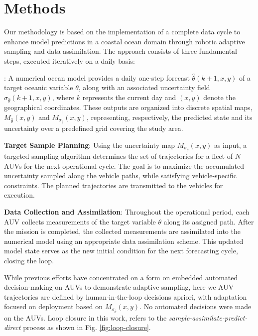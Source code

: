 \section{Methods}
\label{sec:methods}


Our methodology is based on the implementation of a complete data cycle
to enhance model predictions in a coastal ocean domain through robotic
adaptive sampling and data assimilation. The approach consists of three
fundamental steps, executed iteratively on a daily basis:

\begin{description}

\item[Model Forecast and Uncertainty Projection]: A numerical ocean
  model provides a daily one-step forecast $\hat{\theta}(k+1, x, y)$
  of a target oceanic variable $\theta$, along with an associated
  uncertainty field $\sigma_{\hat{\theta}}(k+1, x, y)$, where $k$
  represents the current day and $(x, y)$ denote the geographical
  coordinates.  These outputs are organized into discrete spatial
  maps, $M_{\hat{\theta}}(x, y)$ and
  $M_{\sigma_{\hat{\theta}}}(x, y)$, representing, respectively, the
  predicted state and its uncertainty over a predefined grid covering
  the study area.
    
\item \textbf{Target Sample Planning}: Using the uncertainty map
  $M_{\sigma_{\hat{\theta}}}(x, y)$ as input, a targeted sampling
  algorithm determines the set of trajectories for a fleet of $N$ AUVs
  for the next operational cycle. The goal is to maximize the
  accumulated uncertainty sampled along the vehicle paths, while
  satisfying vehicle-specific constraints. The planned trajectories
  are transmitted to the vehicles for execution.

\item \textbf{Data Collection and Assimilation}: Throughout the
  operational period, each AUV collects measurements of the target
  variable $\theta$ along its assigned path. After the mission is
  completed, the collected measurements are assimilated into the
  numerical model using an appropriate data assimilation scheme. This
  updated model state serves as the new initial condition for the next
  forecasting cycle, closing the loop.

\end{description}

While previous efforts have concentrated on a form on embedded
automated decision-making on AUVs
\cite{mcgann08a,mcgann08b,ryan10,py10,Das-2010-637,das10,olaya12,rajan12}
to demonstrate adaptive sampling, here we AUV trajectories are defined
by human-in-the-loop decisions apriori, with adaptation focused on
deployment based on $M_{\sigma_{\hat{\theta}}}(x, y)$. No automated
decisions were made on the AUVs. Loop closure in this work, refers to
the \emph{sample-assimilate-predict-direct} process as shown in
Fig. \ref{fig:loop-closure}.


